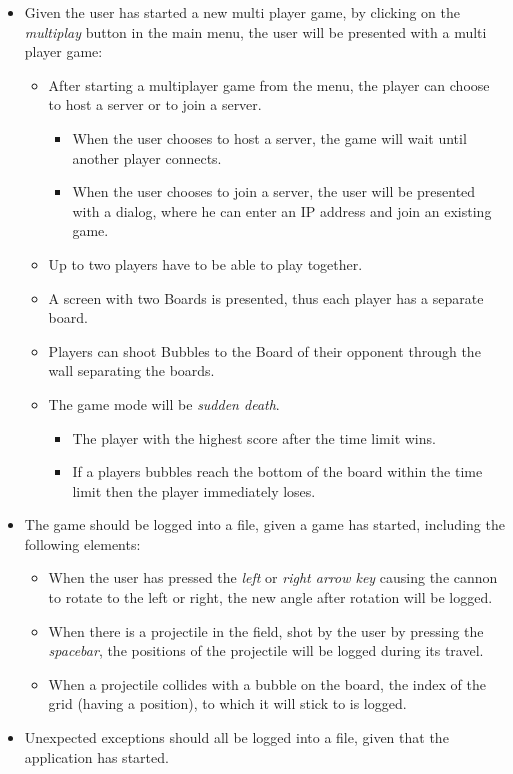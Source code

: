 \documentclass[a4paper,11pt]{article}
\begin{document}
\begin{itemize}
  \item Given the user has started a new multi player game, by clicking on the \textit{multiplay} button in the main menu, the user will be presented with a multi player game:
  \begin{itemize}
    \item After starting a multiplayer game from the menu,
          the player can choose to host a server or to join a server.
    \begin{itemize}
      \item When the user chooses to host a server, the game will wait until another player connects.
      \item When the user chooses to join a server, the user will be presented with a dialog,
            where he can enter an IP address and join an existing game.
    \end{itemize}
    \item Up to two players have to be able to play together.
    \item A screen with two Boards is presented, thus each player has a separate board.
    \item Players can shoot Bubbles to the Board of their opponent
          through the wall separating the boards.
    \item The game mode will be \textit{sudden death}.
    \begin{itemize}
      \item The player with the highest score after the time limit wins.
      \item If a players bubbles reach the bottom of the board within the time limit
            then the player immediately loses.
    \end{itemize}
  \end{itemize}
         \item The game should be logged into a file, given a game has started, including the following elements:
   \begin{itemize}
      \item When the user has pressed the \textit{left} or \textit{right arrow key} causing the cannon to rotate to the left or right, the new angle after rotation will be logged.
      \item When there is a projectile in the field, shot by the user by pressing the \textit{spacebar}, the positions of the projectile will be logged during its travel.
      \item When a projectile collides with a bubble on the board, the index of the grid (having a position), to which it will stick to is logged.
   \end{itemize}
   \item Unexpected exceptions should all be logged into a file, given that the application has started.
\end{itemize}
\end{document}
